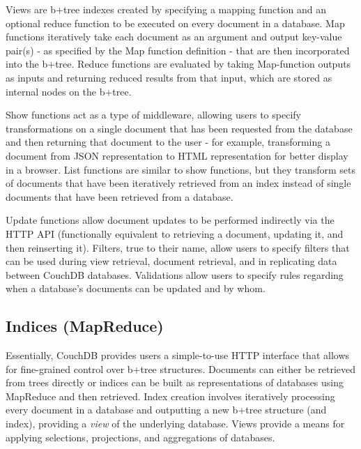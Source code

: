 Views are b+tree indexes created by specifying a mapping function and an optional reduce function to be executed on every document in a database. Map functions iteratively take each document as an argument and output key-value pair(s) - as specified by the Map function definition - that are then incorporated into the b+tree. Reduce functions are evaluated by taking Map-function outputs as inputs and returning reduced results from that input, which are stored as internal nodes on the b+tree.

Show functions act as a type of middleware, allowing users to specify transformations on a single document that has been requested from the database and then returning that document to the user - for example, transforming a document from JSON representation to HTML representation for better display in a browser. List functions are similar to show functions, but they transform sets of documents that have been iteratively retrieved from an index instead of single documents that have been retrieved from a database.

Update functions allow document updates to be performed indirectly via the HTTP API (functionally equivalent to retrieving a document, updating it, and then reinserting it). Filters, true to their name, allow users to specify filters that can be used during view retrieval, document retrieval, and in replicating data between CouchDB databases. Validations allow users to specify rules regarding when a database’s documents can be updated and by whom.

\subsection{Indices (MapReduce)}
Essentially, CouchDB provides users a simple-to-use HTTP interface that allows for fine-grained control over b+tree structures. Documents can either be retrieved from trees directly or indices can be built as representations of databases using MapReduce and then retrieved. Index creation involves iteratively processing every document in a database and outputting a new b+tree structure (and index), providing a \textit{view} of the underlying database. Views provide a means for applying selections, projections, and aggregations of databases.

